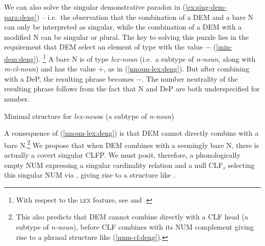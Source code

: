 \documentclass[output=paper,colorlinks,citecolor=brown]{langscibook}
\begin{document}
We can also solve the singular demonstrative paradox in (\ref{ex:sing-dem-para:deng})  -- i.e.\ the observation that  the combination of a DEM and a bare N can only be interpreted as singular, while the combination of a DEM with a modified N can be singular or plural. %
The key to solving this puzzle lies in the requirement that DEM select an element of type  with the   value $-$ (\ref{min-dem:deng}).%
%
\footnote{With respect to the \textsc{lex} feature, see \citet{Pollard&Sag87a} and \citet{Arnold&Sadler92a}.}
%
 A bare N is of type \textit{lex-noun} (i.e.\ a subtype of \textit{n-noun}, along with \textit{m-cl-noun}) and has the  value $+$, as in (\ref{nnoun-lex:deng}). But after combining with a DeP, the resulting phrase becomes  $-$. The number neutrality of the resulting phrase follows from the fact that N and DeP are both underspecified for number.

\ea Minimal structure for \emph{lex-noun}s (a subtype of \textit{n-noun}) \label{nnoun-lex:deng}\\
\z


\noindent A consequence of (\ref{nnoun-lex:deng}) is that DEM cannot directly combine with a bare N.\footnote{This also predicts that DEM cannot combine directly with a CLF  head (a subtype of \textit{n-noun}), before CLF  combines with its NUM complement giving rise to a phrasal structure like (\ref{num-cl:deng}).}  We propose that when DEM combines with a seemingly bare N, there is actually a covert singular CLFP. We must posit, therefore, a phonologically empty NUM expressing a  singular cardinality relation and a null CLF$_{s}$ selecting this singular NUM via , giving rise to a structure like .%
\end{document}
